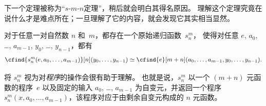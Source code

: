 \documentclass[../../../include/open-logic-section]{subfiles}
\begin{document}

\begin{explain}
下一个定理被称为“$s$-$m$-$n$定理”，稍后就会明白其得名原因。
理解这个定理究竟在说什么才是难点所在；一旦理解了它的内容，就会发现它其实相当显然。
\end{explain}

\begin{thm}
  对于任意一对自然数 $n$ 和~$m$，都存在一个原始递归函数~$s^m_n$，
  使得对任意 $e$, $a_0$, \dots, $a_{m-1}$, $y_0$, \dots, $y_{n-1}$，都有
  \[
  \cfind{s^m_n(e, a_0, \dots, a_{m-1})}[n](y_0, \dots, y_{n-1}) \simeq
  \cfind{e}[m+n](a_0, \dots, a_{m-1}, y_0, \dots, y_{n-1}).
\]
\end{thm}

\begin{explain}
将 $s^m_n$ 视为对\emph{程序}的操作会很有助于理解。
也就是说，$s^m_n$ 以一个 $(m+n)$ 元函数的程序~$e$ 以及固定的输入 $a_0$, \dots, $a_{m-1}$ 为自变元，并返回一个程序
$s^m_n(x, a_0, \dots, a_{m-1})$，该程序对应于由剩余自变元构成的 $n$ 元函数。
\end{explain}
\end{document}
